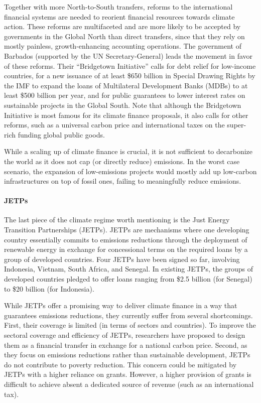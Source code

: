 \documentclass[12pt,english]{article}
\begin{document}
Together with more North-to-South transfers, reforms to the international financial systems are needed to reorient financial resources towards climate action. These reforms are multifaceted and are more likely to be accepted by governments in the Global North than direct transfers, since that they rely on mostly painless, growth-enhancing accounting operations. The government of Barbados (supported by the UN Secretary-General) leads the movement in favor of these reforms. Their ``Bridgetown Initiative'' calls for debt relief for low-income countries, for a new issuance of at least \$650 billion in Special Drawing Rights by the IMF to expand the loans of Multilateral Development Banks (MDBs) to at least \$500 billion per year, and for public guarantees to lower interest rates on sustainable projects in the Global South.\cite{bridgetown_bridgetown_2025} Note that although the Bridgetown Initiative is most famous for its climate finance proposals, it also calls for other reforms, such as a universal carbon price and international taxes on the super-rich funding global public goods. 

While a scaling up of climate finance is crucial, it is not sufficient to decarbonize the world as it does not cap (or directly reduce) emissions. In the worst case scenario, the expansion of low-emissions projects would mostly add up low-carbon infrastructures on top of fossil ones, failing to meaningfully reduce emissions.

\paragraph{JETPs}

The last piece of the climate regime worth mentioning is the Just Energy Transition Partnerships (JETPs). JETPs are mechanisms where one developing country essentially commits to emissions reductions through the deployment of renewable energy in exchange for concessional terms on the required loans by a group of developed countries. Four JETPs have been signed so far, involving Indonesia, Vietnam, South Africa, and Senegal.\cite{ha-duong_just_2023} In existing JETPs, the groups of developed countries pledged to offer loans ranging from \$2.5 billion (for Senegal) to \$20 billion (for Indonesia). 

While JETPs offer a promising way to deliver climate finance in a way that guarantees emissions reductions, they currently suffer from several shortcomings. First, their coverage is limited (in terms of sectors and countries). To improve the sectoral coverage and efficiency of JETPs, researchers have proposed to design them as a financial transfer in exchange for a national carbon price. Second, as they focus on emissions reductions rather than sustainable development, JETPs do not contribute to poverty reduction. This concern could be mitigated by JETPs with a higher reliance on grants.\cite{bolton_why_2025} However, a higher provision of grants is difficult to achieve absent a dedicated source of revenue (such as an international tax).
\end{document}
